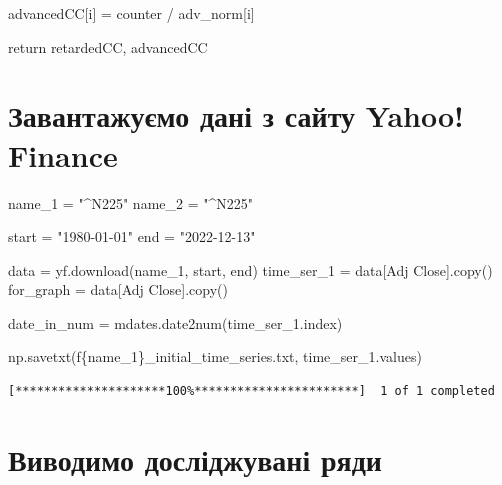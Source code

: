\documentclass[
  letterpaper,
]{report}
\newenvironment{Shaded}{\begin{snugshade}}{\end{snugshade}}
\newcommand{\ControlFlowTok}[1]{\textcolor[rgb]{0.00,0.23,0.31}{#1}}
\newcommand{\NormalTok}[1]{\textcolor[rgb]{0.00,0.23,0.31}{#1}}
\newcommand{\OperatorTok}[1]{\textcolor[rgb]{0.37,0.37,0.37}{#1}}
\newcommand{\SpecialCharTok}[1]{\textcolor[rgb]{0.37,0.37,0.37}{#1}}
\newcommand{\SpecialStringTok}[1]{\textcolor[rgb]{0.13,0.47,0.30}{#1}}
\newcommand{\StringTok}[1]{\textcolor[rgb]{0.13,0.47,0.30}{#1}}
\begin{document}
\begin{Shaded}
\begin{Highlighting}[]
\NormalTok{            advancedCC[i] }\OperatorTok{=}\NormalTok{ counter }\OperatorTok{/}\NormalTok{ adv\_norm[i]}
                 
                
    \ControlFlowTok{return}\NormalTok{ retardedCC, advancedCC}
\end{Highlighting}
\end{Shaded}

\hypertarget{ux437ux430ux432ux430ux43dux442ux430ux436ux443ux454ux43cux43e-ux434ux430ux43dux456-ux437-ux441ux430ux439ux442ux443-yahoo-finance}{%
\section{Завантажуємо дані з сайту Yahoo!
Finance}\label{ux437ux430ux432ux430ux43dux442ux430ux436ux443ux454ux43cux43e-ux434ux430ux43dux456-ux437-ux441ux430ux439ux442ux443-yahoo-finance}}

\begin{Shaded}
\begin{Highlighting}[]
\NormalTok{name\_1 }\OperatorTok{=} \StringTok{"\^{}N225"}
\NormalTok{name\_2 }\OperatorTok{=} \StringTok{"\^{}N225"}

\NormalTok{start }\OperatorTok{=} \StringTok{"1980{-}01{-}01"}
\NormalTok{end }\OperatorTok{=} \StringTok{"2022{-}12{-}13"}

\NormalTok{data }\OperatorTok{=}\NormalTok{ yf.download(name\_1, start, end)}
\NormalTok{time\_ser\_1 }\OperatorTok{=}\NormalTok{ data[}\StringTok{\textquotesingle{}Adj Close\textquotesingle{}}\NormalTok{].copy()}
\NormalTok{for\_graph }\OperatorTok{=}\NormalTok{ data[}\StringTok{\textquotesingle{}Adj Close\textquotesingle{}}\NormalTok{].copy()}

\NormalTok{date\_in\_num }\OperatorTok{=}\NormalTok{ mdates.date2num(time\_ser\_1.index)}

\NormalTok{np.savetxt(}\SpecialStringTok{f\textquotesingle{}}\SpecialCharTok{\{}\NormalTok{name\_1}\SpecialCharTok{\}}\SpecialStringTok{\_initial\_time\_series.txt\textquotesingle{}}\NormalTok{, time\_ser\_1.values)}
\end{Highlighting}
\end{Shaded}

\begin{verbatim}
[*********************100%***********************]  1 of 1 completed
\end{verbatim}

\hypertarget{ux432ux438ux432ux43eux434ux438ux43cux43e-ux434ux43eux441ux43bux456ux434ux436ux443ux432ux430ux43dux456-ux440ux44fux434ux438}{%
\section{Виводимо досліджувані
ряди}\label{ux432ux438ux432ux43eux434ux438ux43cux43e-ux434ux43eux441ux43bux456ux434ux436ux443ux432ux430ux43dux456-ux440ux44fux434ux438}}
\end{document}
